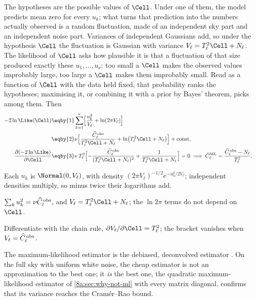 The hypotheses are the possible values of $\Cell$. Under one of them, the model predicts mean
zero for every $u_k$; what turns that prediction into the numbers actually observed is a random
fluctuation, made of an independent sky part and an independent noise part. Variances of
independent Gaussians add, so under the hypothesis $\Cell$ the fluctuation is Gaussian with
variance $V_\ell=T_\ell^2\Cell+N_\ell$. The likelihood of $\Cell$ asks how plausible it is that a
fluctuation of that size produced exactly these $u_1,\dots,u_\nu$: too small a $\Cell$ makes the
observed values improbably large, too large a $\Cell$ makes them improbably small. Read as a
function of $\Cell$ with the data held fixed, that probability ranks the hypotheses; maximising
it, or combining it with a prior by Bayes' theorem, picks among them. Then
\begin{align}
  -2\ln\Like(\Cell)
  &\eqby{1}\sum_{k=1}^{\nu}\Bigl[\frac{u_k^2}{V_\ell}+\ln(2\pi V_\ell)\Bigr] \nonumber\\
  &\eqby{2}\nu\Bigl[\frac{\widehat C^{\,\rm obs}_\ell}{T_\ell^2\Cell+N_\ell}+\ln\bigl(T_\ell^2\Cell+N_\ell\bigr)\Bigr]+\text{const},
  \label{8a:eq:like-noise}\\
  \frac{\partial(-2\ln\Like)}{\partial\Cell}
  &\eqby{3}\nu\,T_\ell^2\Bigl[-\frac{\widehat C^{\,\rm obs}_\ell}{(T_\ell^2\Cell+N_\ell)^2}+\frac{1}{T_\ell^2\Cell+N_\ell}\Bigr]
   =0
   \;\Longrightarrow\;
   \hat C_\ell^{\rm ML}=\frac{\widehat C^{\,\rm obs}_\ell-N_\ell}{T_\ell^2}.
  \label{8a:eq:ml-noise}
\end{align}
\begin{explain}
  \item Each $u_k$ is $\Normal(0,V_\ell)$, with density $(2\pi V_\ell)^{-1/2}e^{-u_k^2/2V_\ell}$;
        independent densities multiply, so minus twice their logarithms add.
  \item $\sum_ku_k^2=\nu\widehat C^{\,\rm obs}_\ell$, and $V_\ell=T_\ell^2\Cell+N_\ell$; the
        $\ln2\pi$ terms do not depend on $\Cell$.
  \item Differentiate with the chain rule, $\partial V_\ell/\partial\Cell=T_\ell^2$; the bracket
        vanishes when $V_\ell=\widehat C^{\,\rm obs}_\ell$.
\end{explain}
The maximum-likelihood estimator is the debiased, deconvolved estimator
. On the full sky with uniform white noise, the cheap
estimator is not an approximation to the best one; it \emph{is} the best one, the
quadratic maximum-likelihood estimator of \cref{8a:sec:why-not-ml} with every matrix
diagonal.  confirms that its variance reaches the Cram\'er--Rao bound.

